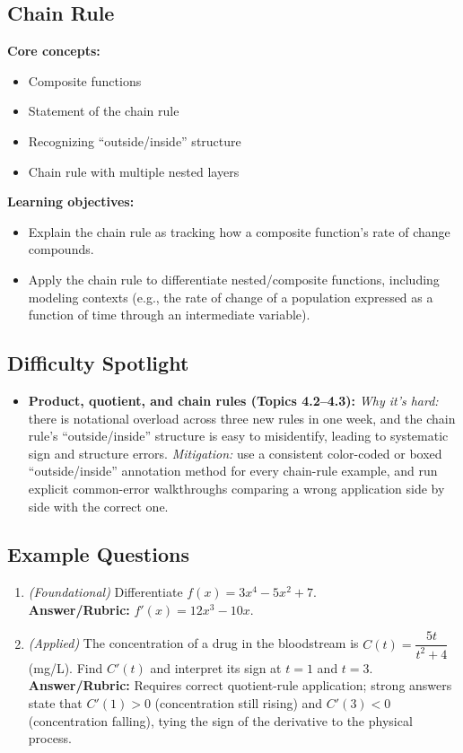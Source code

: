 \documentclass{article}
\begin{document}
\subsection{Chain Rule}
\textbf{Core concepts:}
\begin{itemize}[leftmargin=*]
  \item Composite functions
  \item Statement of the chain rule
  \item Recognizing ``outside/inside'' structure
  \item Chain rule with multiple nested layers
\end{itemize}
\textbf{Learning objectives:}
\begin{itemize}[leftmargin=*]
  \item Explain the chain rule as tracking how a composite function's rate of change compounds.
  \item Apply the chain rule to differentiate nested/composite functions, including modeling contexts (e.g., the rate of change of a population expressed as a function of time through an intermediate variable).
\end{itemize}

\subsection*{Difficulty Spotlight}
\begin{itemize}[leftmargin=*]
  \item \textbf{Product, quotient, and chain rules (Topics 4.2--4.3):} \textit{Why it's hard:} there is notational overload across three new rules in one week, and the chain rule's ``outside/inside'' structure is easy to misidentify, leading to systematic sign and structure errors. \textit{Mitigation:} use a consistent color-coded or boxed ``outside/inside'' annotation method for every chain-rule example, and run explicit common-error walkthroughs comparing a wrong application side by side with the correct one.
\end{itemize}

\subsection*{Example Questions}
\begin{enumerate}[leftmargin=*]
  \item \textit{(Foundational)} Differentiate $f(x) = 3x^4 - 5x^2 + 7$. \\
  \textbf{Answer/Rubric:} $f'(x) = 12x^3 - 10x$.
  \item \textit{(Applied)} The concentration of a drug in the bloodstream is $C(t) = \dfrac{5t}{t^2+4}$ (mg/L). Find $C'(t)$ and interpret its sign at $t=1$ and $t=3$. \\
  \textbf{Answer/Rubric:} Requires correct quotient-rule application; strong answers state that $C'(1)>0$ (concentration still rising) and $C'(3)<0$ (concentration falling), tying the sign of the derivative to the physical process.
\end{enumerate}
\end{document}
